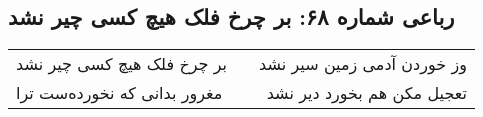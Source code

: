 \begin{center}
\section*{رباعی شماره ۶۸: بر چرخ فلک هیچ کسی چیر نشد}
\label{sec:sh068}
\begin{longtable}{l p{0.5cm} r}
بر چرخ فلک هیچ کسی چیر نشد
&&
وز خوردن آدمی زمین سیر نشد
\\
مغرور بدانی که نخورده‌ست ترا
&&
تعجیل مکن هم بخورد دیر نشد
\\
\end{longtable}
\end{center}
